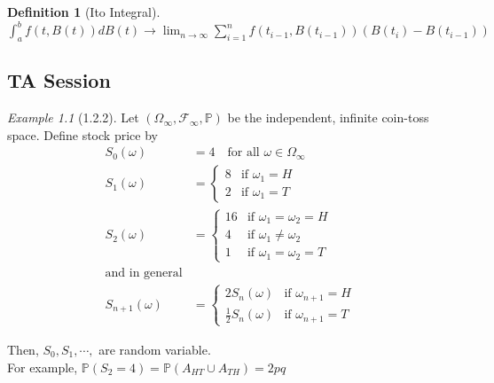 \documentclass[12pt]{report}
\renewcommand{\1}{\mathbb{1}}
\theoremstyle{break}
\theoremstyle{newdef}
\newtheorem{defn}[thm]{Definition} %
\theoremstyle{remark}
\newtheorem*{exmp}{Example} %
\begin{document}
\begin{defn}[Ito Integral]
$
\int_a^b f(t,B(t))dB(t) \rightarrow
\lim_{n\rightarrow\infty}\sum_{i=1}^n f(t_{i-1}, B(t_{i-1}))(B(t_i) - B(t_{i-1}))
$
\end{defn}






\begin{appendices}
\chapter{TA Session}
\begin{exmp}[1.2.2]
Let $(\Omega_\infty, \mathcal{F}_\infty, \mathbb{P})$ be the independent, infinite coin-toss space.
Define stock price by
$$
\begin{aligned}
S_0(\omega) &= 4 \quad \text{for all } \omega \in \Omega_\infty\\
S_1(\omega) &=
\begin{cases}
8 & \text{if } \omega_1 = H\\
2 & \text{if } \omega_1 = T
\end{cases}
\\
S_2(\omega) &=
\begin{cases}
16 & \text{if } \omega_1 = \omega_2 = H\\
4 & \text{if } \omega_1 \neq \omega_2\\
1 & \text{if } \omega_1 = \omega_2 = T
\end{cases}
\\
\text{and in general}
\\
S_{n+1}(\omega) &=
\begin{cases}
2S_n(\omega) & \text{if } \omega_{n+1} = H\\
\frac{1}{2}S_n(\omega) & \text{if } \omega_{n+1} = T
\end{cases}
\end{aligned}
$$

Then, $S_0, S_1, \cdots, $ are random variable.\\
For example, $\mathbb{P}(S_2 = 4) = \mathbb{P}(A_{HT} \cup A_{TH}) = 2pq$

\end{exmp}



\vspace{5mm}


\end{appendices}
\end{document}
